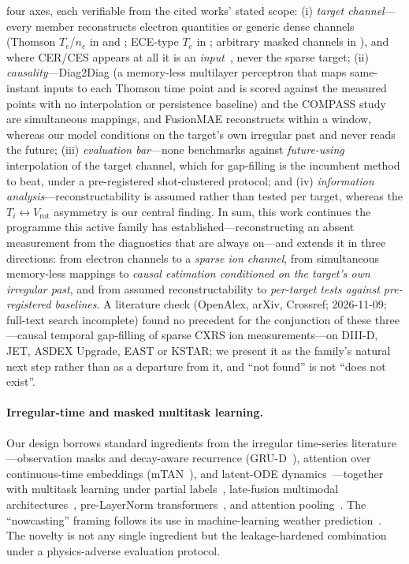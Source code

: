 \documentclass[10pt]{article}
\newcommand{\Ti}{\ensuremath{T_i}}
\newcommand{\Vrot}{\ensuremath{V_\mathrm{rot}}}
\begin{document}
four axes, each verifiable from the cited works' stated scope: (i) \emph{target
channel}---every member reconstructs electron quantities or generic dense
channels (Thomson $T_e$/$n_e$ in \citealp{Jalalvand2025MultimodalSuperresolution}
and \citealp{Imrek2026TemporalSuperresolution}; ECE-type $T_e$ in
\citealp{Wang2025TimeSeries}; arbitrary masked channels in
\citealp{Yang2026FusionmaeSelfsupervised}), and where CER/CES appears at all it
is an \emph{input}~\citep{Jalalvand2025MultimodalSuperresolution}, never the
sparse target; (ii) \emph{causality}---Diag2Diag (a memory-less multilayer perceptron that
maps same-instant inputs to each Thomson time point and is scored against the
measured points with no interpolation or persistence baseline) and the COMPASS
study are simultaneous mappings, and FusionMAE reconstructs within a window,
whereas our model conditions on the target's own irregular past and never reads
the future; (iii) \emph{evaluation bar}---none benchmarks against
\emph{future-using} interpolation of the target channel, which for gap-filling
is the incumbent method to beat, under a pre-registered shot-clustered protocol;
and (iv) \emph{information analysis}---reconstructability is assumed rather than
tested per target, whereas the \Ti$\leftrightarrow$\Vrot{} asymmetry is our
central finding. In sum, this work continues the programme this active family has
established---reconstructing an absent measurement from the diagnostics that are
always on---and extends it in three directions: from electron channels to a
\emph{sparse ion channel}, from simultaneous memory-less mappings to \emph{causal
estimation conditioned on the target's own irregular past}, and from assumed
reconstructability to \emph{per-target tests against pre-registered baselines}.
A literature check (OpenAlex, arXiv, Crossref; 2026-11-09; full-text search
incomplete) found no precedent for the conjunction of these three---causal temporal
gap-filling of sparse CXRS ion measurements---on DIII-D, JET, ASDEX Upgrade, EAST or
KSTAR; we present it as the family's natural next step rather than as a departure
from it, and ``not found'' is not ``does not exist''.

\paragraph{Irregular-time and masked multitask learning.}
Our design borrows standard ingredients from the irregular time-series
literature---observation masks and decay-aware recurrence
(GRU-D~\citep{Che2018RecurrentNeural}), attention over continuous-time
embeddings (mTAN~\citep{Shukla2021MultitimeAttention}), and latent-ODE
dynamics~\citep{Rubanova2019LatentOrdinary}---together with multitask learning
under partial labels~\citep{Caruana1997MultitaskLearning}, late-fusion multimodal
architectures~\citep{Ngiam2011MultimodalDeep,Baltruaitis2018MultimodalMachine},
pre-LayerNorm transformers~\citep{Xiong2020LayerNormalization}, and attention
pooling~\citep{Ilse2018AttentionbasedDeep}. The ``nowcasting'' framing follows
its use in machine-learning weather
prediction~\citep{Shi2015ConvolutionalLstm,Ravuri2021SkilfulPrecipitation}. The
novelty is not any single ingredient but the leakage-hardened combination under a
physics-adverse evaluation protocol.
\end{document}
